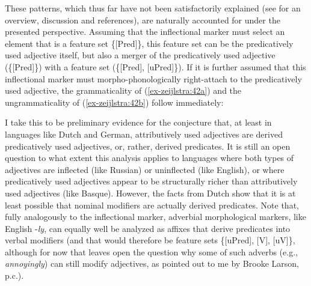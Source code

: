 \documentclass[output=paper
,modfonts
,nonflat]{langsci/langscibook}
\begin{document}
These patterns, which thus far have not been satisfactorily explained (see \citealt{SheehanTA} for an overview, discussion and references), are naturally accounted for under the presented perspective. Assuming that the inflectional marker must select an element that is a feature set \{[Pred]\}, this feature set can be the predicatively used adjective itself, but also a merger of the predicatively used adjective (\{[Pred]\}) with a feature set (\{[Pred], [uPred]\}). If it is further assumed that this inflectional marker must morpho-phonologically right-attach to the predicatively used adjective, the grammaticality of (\ref{ex-zeijlstra:42a}) and the ungrammaticality of (\ref{ex-zeijlstra:42b}) follow immediately:

\begin{exe}
\ex
	\xlist
	
	\endxlist
\end{exe}
I take this to be preliminary evidence for the conjecture that, at least in languages like Dutch and German, attributively used adjectives are derived predicatively used adjectives, or, rather, derived predicates. It is still an open question to what extent this analysis applies to languages where both types of adjectives are inflected (like Russian) or uninflected (like English), or where predicatively used adjectives appear to be structurally richer than attributively used adjectives (like Basque). However, the facts from Dutch show that it is at least possible that nominal modifiers are actually derived predicates. Note that, fully analogously to the inflectional marker, adverbial morphological markers, like English -\textit{ly}, can equally well be analyzed as affixes that derive predicates into verbal modifiers (and that would therefore be feature sets \{[uPred], [V], [uV]\}, although for now that leaves open the question why some of such adverbs (e.g., \textit{annoyingly}) can still modify adjectives, as pointed out to me by Brooke Larson, p.c.).
\end{document}
